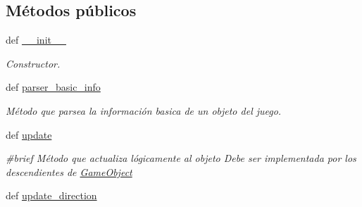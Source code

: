 \subsection*{\-Métodos públicos}
\begin{DoxyCompactItemize}
\item 
def \hyperlink{classengine_1_1gameobject_1_1GameObject_a884382281b28ff8b2e65f5a350e1165f}{\-\_\-\-\_\-init\-\_\-\-\_\-}
\begin{DoxyCompactList}\small\item\em \-Constructor. \end{DoxyCompactList}\item 
def \hyperlink{classengine_1_1gameobject_1_1GameObject_a5bdbc7bb6f037ec961ad9717d07bab79}{parser\-\_\-basic\-\_\-info}
\begin{DoxyCompactList}\small\item\em \-Método que parsea la información basica de un objeto del juego. \end{DoxyCompactList}\item 
\hypertarget{classengine_1_1gameobject_1_1GameObject_a8a583fb3c7611c68e6cf2491e9b48d0d}{
def \hyperlink{classengine_1_1gameobject_1_1GameObject_a8a583fb3c7611c68e6cf2491e9b48d0d}{update}}
\label{classengine_1_1gameobject_1_1GameObject_a8a583fb3c7611c68e6cf2491e9b48d0d}

\begin{DoxyCompactList}\small\item\em \#brief \-Método que actualiza lógicamente al objeto \-Debe ser implementada por los descendientes de \hyperlink{classengine_1_1gameobject_1_1GameObject}{\-Game\-Object} \end{DoxyCompactList}\item 
\hypertarget{classengine_1_1gameobject_1_1GameObject_ac62af478f9134b995bba3f989007cf39}{
def \hyperlink{classengine_1_1gameobject_1_1GameObject_ac62af478f9134b995bba3f989007cf39}{update\-\_\-direction}}
\label{classengine_1_1gameobject_1_1GameObject_ac62af478f9134b995bba3f989007cf39}


\end{DoxyCompactItemize}
